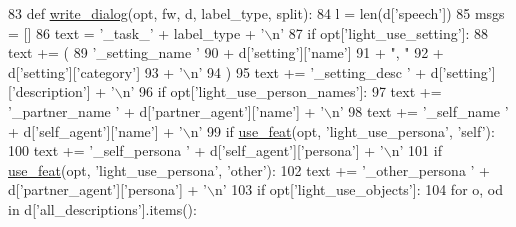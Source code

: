 \begin{DoxyCode}
83 \textcolor{keyword}{def }\hyperlink{namespaceparlai_1_1tasks_1_1light__dialog_1_1builder_a233ecce0ba4b1a0c023e855629986d69}{write\_dialog}(opt, fw, d, label\_type, split):
84     l = len(d[\textcolor{stringliteral}{'speech'}])
85     msgs = []
86     text = \textcolor{stringliteral}{'\_task\_'} + label\_type + \textcolor{stringliteral}{'\(\backslash\)n'}
87     \textcolor{keywordflow}{if} opt[\textcolor{stringliteral}{'light\_use\_setting'}]:
88         text += (
89             \textcolor{stringliteral}{'\_setting\_name '}
90             + d[\textcolor{stringliteral}{'setting'}][\textcolor{stringliteral}{'name'}]
91             + \textcolor{stringliteral}{", "}
92             + d[\textcolor{stringliteral}{'setting'}][\textcolor{stringliteral}{'category'}]
93             + \textcolor{stringliteral}{'\(\backslash\)n'}
94         )
95         text += \textcolor{stringliteral}{'\_setting\_desc '} + d[\textcolor{stringliteral}{'setting'}][\textcolor{stringliteral}{'description'}] + \textcolor{stringliteral}{'\(\backslash\)n'}
96     \textcolor{keywordflow}{if} opt[\textcolor{stringliteral}{'light\_use\_person\_names'}]:
97         text += \textcolor{stringliteral}{'\_partner\_name '} + d[\textcolor{stringliteral}{'partner\_agent'}][\textcolor{stringliteral}{'name'}] + \textcolor{stringliteral}{'\(\backslash\)n'}
98         text += \textcolor{stringliteral}{'\_self\_name '} + d[\textcolor{stringliteral}{'self\_agent'}][\textcolor{stringliteral}{'name'}] + \textcolor{stringliteral}{'\(\backslash\)n'}
99     \textcolor{keywordflow}{if} \hyperlink{namespaceparlai_1_1tasks_1_1light__dialog_1_1builder_ad9de2827ebcf8386662e48c7fe011e43}{use\_feat}(opt, \textcolor{stringliteral}{'light\_use\_persona'}, \textcolor{stringliteral}{'self'}):
100         text += \textcolor{stringliteral}{'\_self\_persona '} + d[\textcolor{stringliteral}{'self\_agent'}][\textcolor{stringliteral}{'persona'}] + \textcolor{stringliteral}{'\(\backslash\)n'}
101     \textcolor{keywordflow}{if} \hyperlink{namespaceparlai_1_1tasks_1_1light__dialog_1_1builder_ad9de2827ebcf8386662e48c7fe011e43}{use\_feat}(opt, \textcolor{stringliteral}{'light\_use\_persona'}, \textcolor{stringliteral}{'other'}):
102         text += \textcolor{stringliteral}{'\_other\_persona '} + d[\textcolor{stringliteral}{'partner\_agent'}][\textcolor{stringliteral}{'persona'}] + \textcolor{stringliteral}{'\(\backslash\)n'}
103     \textcolor{keywordflow}{if} opt[\textcolor{stringliteral}{'light\_use\_objects'}]:
104         \textcolor{keywordflow}{for} o, od \textcolor{keywordflow}{in} d[\textcolor{stringliteral}{'all\_descriptions'}].items():

\end{DoxyCode}

